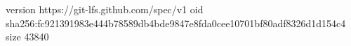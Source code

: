 version https://git-lfs.github.com/spec/v1
oid sha256:fc921391983e444b78589db4bde9847e8fda0cee10701bf80adf8326d1d154c4
size 43840
